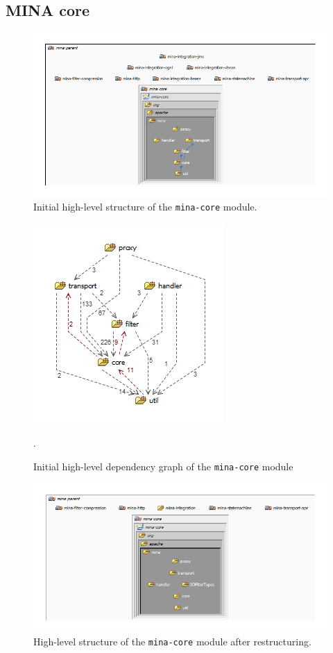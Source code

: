 \subsection{MINA core}
\begin{figure}[H]
    \centering
    \includegraphics[width=\textwidth]{images/MINA_core_initial.png}
    \caption{Initial high-level structure of the \texttt{mina-core} module.}
    \label{fig:mina_core_initial}
\end{figure}

\begin{figure}[H]
    \centering
    \includegraphics{images/MINA_core_initial_dependencies.png}
    \caption{Initial high-level dependency graph of the \texttt{mina-core} module}.
    \label{fig:mina_core_dependencies_initial}
\end{figure}

\begin{figure}[H]
    \centering
    \includegraphics[width=\textwidth]{images/MINA_core_restructure.png}
    \caption{High-level structure of the \texttt{mina-core} module after restructuring.}
    \label{fig:mina_core_restructured}
\end{figure}

